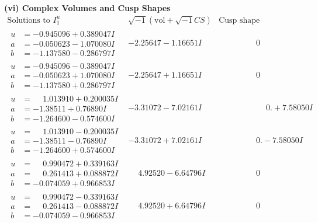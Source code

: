 \documentclass[1p]{elsarticle_modified}
\theoremstyle{definition}
\newcommand{\I}{\sqrt{-1}}
\begin{document}
\newpage\flushleft \textbf{(vi) Complex Volumes and Cusp Shapes}
$$\begin{array}{c|c|c}  
\text{Solutions to }I^u_{1}& \I (\text{vol} + \sqrt{-1}CS) & \text{Cusp shape}\\
 \hline 
\begin{aligned}
u &= -0.945096 + 0.389047 I \\
a &= -0.050623 - 1.070080 I \\
b &= -1.137580 - 0.286797 I\end{aligned}
 & -2.25647 - 1.16651 I & \phantom{-0.000000 } 0 \\ \hline\begin{aligned}
u &= -0.945096 - 0.389047 I \\
a &= -0.050623 + 1.070080 I \\
b &= -1.137580 + 0.286797 I\end{aligned}
 & -2.25647 + 1.16651 I & \phantom{-0.000000 } 0 \\ \hline\begin{aligned}
u &= \phantom{-}1.013910 + 0.200035 I \\
a &= -1.38511 + 0.76890 I \\
b &= -1.264600 - 0.574600 I\end{aligned}
 & -3.31072 - 7.02161 I & \phantom{-0.000000 -}0. + 7.58050 I \\ \hline\begin{aligned}
u &= \phantom{-}1.013910 - 0.200035 I \\
a &= -1.38511 - 0.76890 I \\
b &= -1.264600 + 0.574600 I\end{aligned}
 & -3.31072 + 7.02161 I & \phantom{-0.000000 } 0. - 7.58050 I \\ \hline\begin{aligned}
u &= \phantom{-}0.990472 + 0.339163 I \\
a &= \phantom{-}0.261413 + 0.088872 I \\
b &= -0.074059 + 0.966853 I\end{aligned}
 & \phantom{-}4.92520 - 6.64796 I & \phantom{-0.000000 } 0 \\ \hline\begin{aligned}
u &= \phantom{-}0.990472 - 0.339163 I \\
a &= \phantom{-}0.261413 - 0.088872 I \\
b &= -0.074059 - 0.966853 I\end{aligned}
 & \phantom{-}4.92520 + 6.64796 I & \phantom{-0.000000 } 0 \\ \hline\begin{aligned}

\end{aligned}
\end{array}$$
\end{document}
